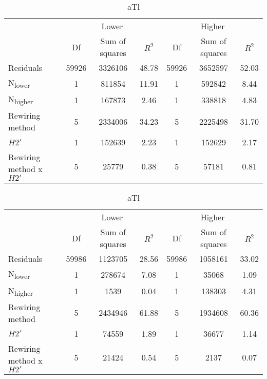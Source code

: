 \documentclass[12pt,a4paper]{article}
\begin{document}
\begin{table}[H]
\medskip
\begin{subtable}{\linewidth}
\caption{Atl}
\centering
\begin{tabularx}{\linewidth}{@{} X *6{c} @{}}
\toprule
  & \multicolumn{3}{c}{Lower} & \multicolumn{3}{c}{Higher} \\ \cmidrule(l){2-4} \cmidrule(l){5-7}
  						& Df		& Sum of squares	& $R^2$	& Df 	& Sum of squares	& $R^2$ \\ \midrule
Residuals 				& 59926 & 3326106		& 48.78	& 59926 & 3652597 		& 52.03   \\
N\textsubscript{lower} 	& 1 		& 811854 		& 11.91 	& 1		& 592842		& 8.44  \\
N\textsubscript{higher} 	& 1 		& 167873 		& 2.46	& 1 		& 338818 			& 4.83  \\
Rewiring method 			& 5 		& 2334006			& 34.23 	& 5 		& 2225498			& 31.70  \\
$H2'$ 					& 1 		& 152639 			& 2.23 	& 1 		& 152629			& 2.17 \\
Rewiring method x $H2'$ 	& 5 		& 25779 			& 0.38 	& 5 		& 57181			& 0.81  \\ \bottomrule
\end{tabularx}
\end{subtable}

\medskip
\begin{subtable}{\linewidth}
\caption{aTl}
\centering
\begin{tabularx}{\linewidth}{@{} X *6{c} @{}}
\toprule
  & \multicolumn{3}{c}{Lower} & \multicolumn{3}{c}{Higher} \\ \cmidrule(l){2-4} \cmidrule(l){5-7}
  						& Df		& Sum of squares	& $R^2$	& Df 	& Sum of squares	& $R^2$ \\ \midrule
Residuals 				& 59986 & 1123705		& 28.56	& 59986 & 1058161		& 33.02   \\
N\textsubscript{lower} 	& 1 		& 278674 		& 7.08 	& 1		& 35068			& 1.09  \\
N\textsubscript{higher} 	& 1 		& 1539 			& 0.04	& 1 		& 138303		& 4.31  \\
Rewiring method 			& 5 		& 2434946 		& 61.88 	& 5 		& 1934608		& 60.36  \\
$H2'$ 					& 1 		& 74559 			& 1.89 	& 1 		& 36677			& 1.14 \\
Rewiring method x $H2'$ 	& 5 		& 21424 			& 0.54 	& 5 		& 2137			& 0.07  \\ \bottomrule
\end{tabularx}

\end{subtable}
\end{table}
\end{document}
